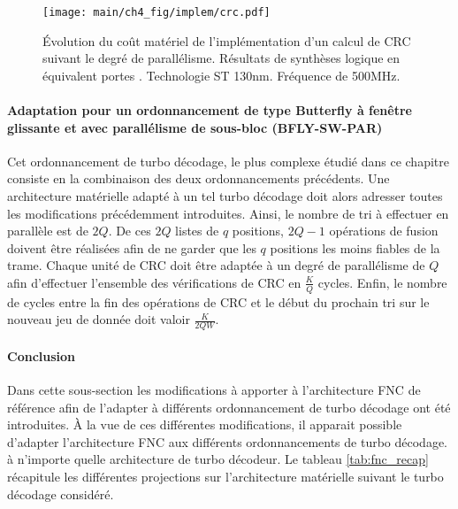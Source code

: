 \begin{figure}[!ht]
	\centering
	\texttt{[image: main/ch4\_fig/implem/crc.pdf]}
	\caption{Évolution du coût matériel de l'implémentation d'un calcul de CRC suivant le degré de parallélisme.
	Résultats de synthèses logique en équivalent portes . Technologie ST 130nm. Fréquence de 500MHz.}
	\label{fig:crc_par}

\end{figure}

\paragraph*{Adaptation pour un ordonnancement de type Butterfly à fenêtre glissante et avec parallélisme de sous-bloc 
(BFLY-SW-PAR)}
Cet ordonnancement de turbo décodage, le plus complexe étudié dans ce chapitre consiste en la combinaison des
deux ordonnancements précédents. Une architecture matérielle adapté à un tel turbo décodage doit alors adresser 
toutes les modifications précédemment introduites. Ainsi, le nombre de tri à effectuer en parallèle est de $2Q$. De ces $2Q$ listes de
$q$ positions, $2Q-1$ opérations de fusion doivent être réalisées afin de ne garder que les $q$ positions les moins 
fiables de la trame. Chaque unité de CRC doit être adaptée à un degré de parallélisme de $Q$ afin d'effectuer 
l'ensemble des 
vérifications de CRC en $\frac{K}{Q}$ cycles. Enfin, le nombre de cycles entre la fin des 
opérations de CRC et le début du prochain tri sur le nouveau jeu de donnée doit valoir $\frac{K}{2QW}$.

\paragraph*{Conclusion}
Dans cette sous-section les modifications à apporter à l'architecture FNC de référence afin de l'adapter à différents 
ordonnancement de turbo décodage ont été introduites. À la vue de ces différentes modifications, il apparait possible 
d'adapter l'architecture FNC aux différents ordonnancements de turbo décodage.  à n'importe quelle architecture de turbo 
décodeur. Le tableau \ref{tab:fnc_recap} récapitule les différentes projections sur l'architecture matérielle suivant le 
turbo décodage considéré.

